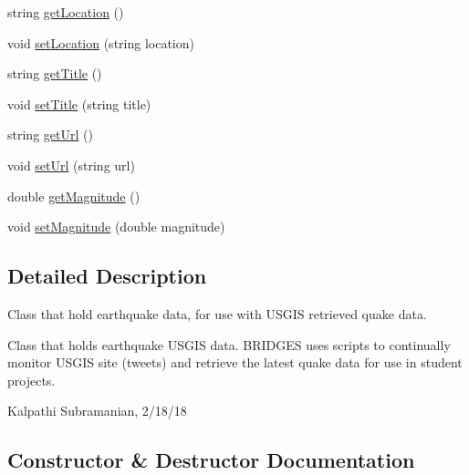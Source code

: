 \begin{DoxyCompactItemize}
\item 
string \hyperlink{classbridges_1_1_earthquake_u_s_g_s_aa04c172c5c77bd2f88b1dd319130b9eb}{get\+Location} ()
\item 
void \hyperlink{classbridges_1_1_earthquake_u_s_g_s_a5dc533759cc900440d70bdfc68f16599}{set\+Location} (string location)
\item 
string \hyperlink{classbridges_1_1_earthquake_u_s_g_s_a6b8e10f1a092c8884428cecbd1defb19}{get\+Title} ()
\item 
void \hyperlink{classbridges_1_1_earthquake_u_s_g_s_a78fe86dcb1bae8470d5ac58fdda2fe51}{set\+Title} (string title)
\item 
string \hyperlink{classbridges_1_1_earthquake_u_s_g_s_a60961cae033becb6144c883a7a984f86}{get\+Url} ()
\item 
void \hyperlink{classbridges_1_1_earthquake_u_s_g_s_ac07298c50e03955d167a2ca38c5150be}{set\+Url} (string url)
\item 
double \hyperlink{classbridges_1_1_earthquake_u_s_g_s_a51659fac2236aaaa03d2921fd7c1fcf9}{get\+Magnitude} ()
\item 
void \hyperlink{classbridges_1_1_earthquake_u_s_g_s_aae8be6112f5c27c168c452261d9b29a2}{set\+Magnitude} (double magnitude)
\end{DoxyCompactItemize}


\subsection{Detailed Description}
Class that hold earthquake data, for use with U\+S\+G\+I\+S retrieved quake data. 

Class that holds earthquake U\+S\+G\+I\+S data. B\+R\+I\+D\+G\+E\+S uses scripts to continually monitor U\+S\+G\+I\+S site (tweets) and retrieve the latest quake data for use in student projects.

Kalpathi Subramanian, 2/18/18 

\subsection{Constructor \& Destructor Documentation}
\hypertarget{classbridges_1_1_earthquake_u_s_g_s_a540ae74c248da179fbbd182b843a14e0}{}
